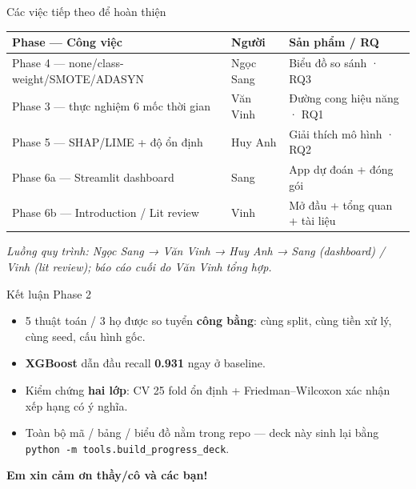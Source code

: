 \documentclass[aspectratio=169,11pt]{beamer}
\begin{document}
\begin{frame}{Các việc tiếp theo để hoàn thiện}
\small
\begin{tabular}{@{}lll@{}}
\toprule
\textbf{Phase — Công việc} & \textbf{Người} & \textbf{Sản phẩm / RQ} \\
\midrule
Phase 4 — none/class-weight/SMOTE/ADASYN & Ngọc Sang & Biểu đồ so sánh · RQ3 \\
Phase 3 — thực nghiệm 6 mốc thời gian & Văn Vinh & Đường cong hiệu năng · RQ1 \\
Phase 5 — SHAP/LIME + độ ổn định & Huy Anh & Giải thích mô hình · RQ2 \\
Phase 6a — Streamlit dashboard & Sang & App dự đoán + đóng gói \\
Phase 6b — Introduction / Lit review & Vinh & Mở đầu + tổng quan + tài liệu \\
\bottomrule
\end{tabular}
\vspace{3mm}

\emph{Luồng quy trình: Ngọc Sang → Văn Vinh → Huy Anh → Sang (dashboard) / Vinh (lit review); báo cáo cuối do Văn Vinh tổng hợp.}
\end{frame}

\begin{frame}{Kết luận Phase 2}
\begin{itemize}
  \item 5 thuật toán / 3 họ được so tuyển \textbf{công bằng}: cùng split, cùng tiền xử lý, cùng seed, cấu hình gốc.
  \item \textbf{XGBoost} dẫn đầu recall \textbf{0.931} ngay ở baseline.
  \item Kiểm chứng \textbf{hai lớp}: CV 25 fold ổn định + Friedman--Wilcoxon xác nhận xếp hạng có ý nghĩa.
  \item Toàn bộ mã / bảng / biểu đồ nằm trong repo — deck này sinh lại bằng \texttt{python -m tools.build\_progress\_deck}.
\end{itemize}
\vspace{3mm}
\centering\color{themecol}\textbf{Em xin cảm ơn thầy/cô và các bạn!}
\end{frame}
\end{document}
